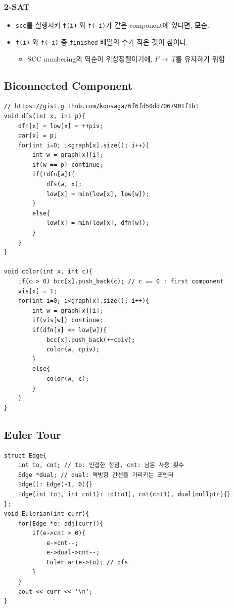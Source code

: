 \documentclass[landscape, 8pt, a4paper, oneside, twocolumn]{extarticle}
\begin{document}
\subsubsection{2-SAT}
\begin{itemize}
    \item \texttt{scc}를 실행시켜 \texttt{f(i)} 와 \texttt{f(-i)}가 같은 component에 있다면, 모순.
    \item \texttt{f(i)} 와 \texttt{f(-i)} 중 \texttt{finished} 배열의 수가 작은 것이 참이다.
    \begin{itemize}
    \item SCC numbering의 역순이 위상정렬이기에, $ F \to\ T$를 유지하기 위함
    \end{itemize}
\end{itemize}
\subsection{Biconnected Component}
\begin{verbatim}
// https://gist.github.com/koosaga/6f6fd50dd7067901f1b1
void dfs(int x, int p){
    dfn[x] = low[x] = ++piv;
    par[x] = p;
    for(int i=0; i<graph[x].size(); i++){
        int w = graph[x][i];
        if(w == p) continue;
        if(!dfn[w]){
            dfs(w, x);
            low[x] = min(low[x], low[w]);
        }
        else{
            low[x] = min(low[x], dfn[w]);
        }
    }
}

void color(int x, int c){
    if(c > 0) bcc[x].push_back(c); // c == 0 : first component
    vis[x] = 1;
    for(int i=0; i<graph[x].size(); i++){
        int w = graph[x][i];
        if(vis[w]) continue;
        if(dfn[x] <= low[w]){
            bcc[x].push_back(++cpiv);
            color(w, cpiv);
        }
        else{
            color(w, c);
        }
    }
}
\end{verbatim}
\subsection{Euler Tour}
\begin{verbatim}
struct Edge{
    int to, cnt; // to: 인접한 정점, cnt: 남은 사용 횟수
    Edge *dual; // dual: 역방향 간선을 가리키는 포인터
    Edge(): Edge(-1, 0){}
    Edge(int to1, int cnt1): to(to1), cnt(cnt1), dual(nullptr){}
};
void Eulerian(int curr){
    for(Edge *e: adj[curr]){
        if(e->cnt > 0){
            e->cnt--;
            e->dual->cnt--;
            Eulerian(e->to); // dfs
        }
    }
    cout << curr << '\n';
}
\end{verbatim}
\end{document}

